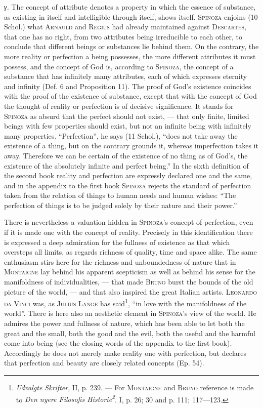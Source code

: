 \documentclass[12pt]{article}
\newcommand{\opage}[1]{\marginnote{\footnotesize\textit{[#1]}}}
\begin{document}
\textit{γ.} The concept of attribute denotes a property in which the essence of
substance, as existing in itself and intelligible through itself, shows itself.
\textsc{Spinoza} enjoins (10 Schol.) what \textsc{Arnauld} and \textsc{Regius} had
already maintained against \textsc{Descartes}, that one has no right, from two
attributes being irreducible to each other, to conclude that different beings or
substances lie behind them. On the contrary, the more reality or perfection a being
possesses, the more different attributes it must possess, and the concept of God is,
according to \textsc{Spinoza}, the concept of a substance that has infinitely many
attributes, each of which expresses eternity and infinity (Def. 6 and Proposition
11). The proof of God's existence coincides with the proof of the existence of
substance, except that with the concept of God the thought of reality or perfection
is of decisive significance. It stands for \textsc{Spinoza} as absurd that the
perfect should not exist, --- that only finite, limited beings with few properties
should exist, but not an infinite being with infinitely many properties.
``Perfection'', he says (11 Schol.), ``does not take away the existence of a thing,
but on the contrary grounds it, whereas imperfection takes it away. Therefore we can
be certain of the existence of no thing as of God's, the existence of the absolutely
infinite and perfect being.'' In the sixth definition of the second book reality and
perfection are expressly declared one and the same, and in the appendix to the first
book \textsc{Spinoza} rejects the standard of perfection taken from the relation of
things to human needs and human wishes: ``The perfection of things is to be judged
solely by their nature and their power.''

\opage{22}There is nevertheless a valuation hidden in \textsc{Spinoza}'s concept of
perfection, even if it is made one with the concept of reality. Precisely in this
identification there is expressed a deep admiration for the fullness of existence as
that which oversteps all limits, as regards richness of quality, time and space alike.
The same enthusiasm stirs here for the richness and unboundedness of nature that in
\textsc{Montaigne} lay behind his apparent scepticism as well as behind his sense for
the manifoldness of individualities, --- that made \textsc{Bruno} burst the bounds of
the old picture of the world, --- and that also inspired the great Italian artists.
\textsc{Leonardo da Vinci} was, as \textsc{Julius Lange} has
said\footnote{\textit{Udvalgte Skrifter}, II, p. 239. --- For \textsc{Montaigne} and
\textsc{Bruno} reference is made to \textit{Den nyere Filosofis
Historie\textsuperscript{2}}. I, p. 26; 30 and p. 111; 117---123.}, ``in love with
the manifoldness of the world''. There is here also an aesthetic element in
\textsc{Spinoza}'s view of the world. He admires the power and fullness of nature,
which has been able to let both the great and the small, both the good and the evil,
both the useful and the harmful come into being (see the closing words of the appendix
to the first book). Accordingly he does not merely make reality one with perfection,
but declares that perfection and beauty are closely related concepts (Ep. 54).
\end{document}
